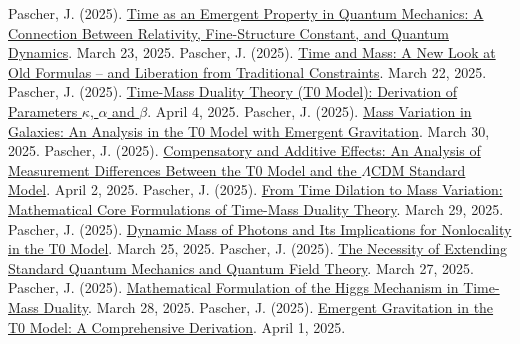 \documentclass[a4paper,12pt]{article}
\begin{document}
	\begin{thebibliography}{99}
		 Pascher, J. (2025). \href{https://github.com/jpascher/T0-Time-Mass-Duality/tree/main/2/pdf/English/ZeitEmergentQMEn.pdf}{Time as an Emergent Property in Quantum Mechanics: A Connection Between Relativity, Fine-Structure Constant, and Quantum Dynamics}. March 23, 2025.
		 Pascher, J. (2025). \href{https://github.com/jpascher/T0-Time-Mass-Duality/tree/main/2/pdf/English/ZeitMasseNeuerBlickEn.pdf}{Time and Mass: A New Look at Old Formulas – and Liberation from Traditional Constraints}. March 22, 2025.
		 Pascher, J. (2025). \href{https://github.com/jpascher/T0-Time-Mass-Duality/tree/main/2/pdf/English/ZeitMasseT0ParamsEn.pdf}{Time-Mass Duality Theory (T0 Model): Derivation of Parameters $\kappa$, $\alpha$ and $\beta$}. April 4, 2025.
		 Pascher, J. (2025). \href{https://github.com/jpascher/T0-Time-Mass-Duality/tree/main/2/pdf/English/MassVarGalaxienEn.pdf}{Mass Variation in Galaxies: An Analysis in the T0 Model with Emergent Gravitation}. March 30, 2025.
		 Pascher, J. (2025). \href{https://github.com/jpascher/T0-Time-Mass-Duality/tree/main/2/pdf/English/MessdifferenzenT0StandardEn.pdf}{Compensatory and Additive Effects: An Analysis of Measurement Differences Between the T0 Model and the $\Lambda$CDM Standard Model}. April 2, 2025.
		 Pascher, J. (2025). \href{https://github.com/jpascher/T0-Time-Mass-Duality/tree/main/2/pdf/English/MathZeitMasseLagrangeEn.pdf}{From Time Dilation to Mass Variation: Mathematical Core Formulations of Time-Mass Duality Theory}. March 29, 2025.
		 Pascher, J. (2025). \href{https://github.com/jpascher/T0-Time-Mass-Duality/tree/main/2/pdf/English/DynMassePhotonenNichtlokalEn.pdf}{Dynamic Mass of Photons and Its Implications for Nonlocality in the T0 Model}. March 25, 2025.
		 Pascher, J. (2025). \href{https://github.com/jpascher/T0-Time-Mass-Duality/tree/main/2/pdf/English/NotwendigkeitQMErweiterungEn.pdf}{The Necessity of Extending Standard Quantum Mechanics and Quantum Field Theory}. March 27, 2025.
		 Pascher, J. (2025). \href{https://github.com/jpascher/T0-Time-Mass-Duality/tree/main/2/pdf/English/MathHiggsZeitMasseEn.pdf}{Mathematical Formulation of the Higgs Mechanism in Time-Mass Duality}. March 28, 2025.
		 Pascher, J. (2025). \href{https://github.com/jpascher/T0-Time-Mass-Duality/tree/main/2/pdf/English/EmergentGravT0En.pdf}{Emergent Gravitation in the T0 Model: A Comprehensive Derivation}. April 1, 2025.

\end{thebibliography}
\end{document}
